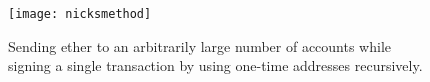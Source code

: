 \begin{figure}[!htbp]
\centering
\texttt{[image: nicksmethod]}
\caption{Sending ether to an arbitrarily large number of accounts while signing a single transaction by using one-time addresses recursively.}
\label{fig:nicksmethod}
\end{figure}
